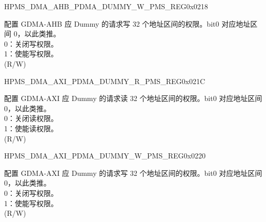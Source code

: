 \begin{register}{H}{PMS\_DMA\_AHB\_PDMA\_DUMMY\_W\_PMS\_REG}{0x0218}\label{regdesc:PMSDMAAHBPDMADUMMYWPMSREG}
%
\regnewline%
\begin{regdesc}\begin{reglist}
\label{fielddesc:PMSDMAAHBPDMADUMMYWPMS}\item [PMS\_DMA\_AHB\_PDMA\_DUMMY\_W\_PMS] 配置 GDMA-AHB 应 Dummy 的请求写 32 个地址区间的权限。bit0 对应地址区间 0，以此类推。\\
0：关闭写权限。\\
1：使能写权限。\\ (R/W)
\end{reglist}\end{regdesc}
\end{register}


\begin{register}{H}{PMS\_DMA\_AXI\_PDMA\_DUMMY\_R\_PMS\_REG}{0x021C}\label{regdesc:PMSDMAAXIPDMADUMMYRPMSREG}
%
\regnewline%
\begin{regdesc}\begin{reglist}
\label{fielddesc:PMSDMAAXIPDMADUMMYRPMS}\item [PMS\_DMA\_AXI\_PDMA\_DUMMY\_R\_PMS] 配置 GDMA-AXI 应 Dummy 的请求读 32 个地址区间的权限。bit0 对应地址区间 0，以此类推。\\
0：关闭读权限。\\
1：使能读权限。\\ (R/W)
\end{reglist}\end{regdesc}
\end{register}


\begin{register}{H}{PMS\_DMA\_AXI\_PDMA\_DUMMY\_W\_PMS\_REG}{0x0220}\label{regdesc:PMSDMAAXIPDMADUMMYWPMSREG}
%
\regnewline%
\begin{regdesc}\begin{reglist}
\label{fielddesc:PMSDMAAXIPDMADUMMYWPMS}\item [PMS\_DMA\_AXI\_PDMA\_DUMMY\_W\_PMS] 配置 GDMA-AXI 应 Dummy 的请求写 32 个地址区间的权限。bit0 对应地址区间 0，以此类推。\\
0：关闭写权限。\\
1：使能写权限。\\ (R/W)
\end{reglist}\end{regdesc}
\end{register}


